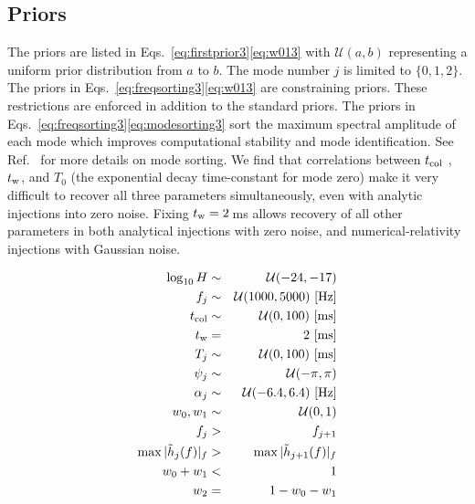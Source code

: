\documentclass[../Thesis.tex]{subfiles}
\begin{document}
\begin{subappendices}


\renewcommand\thefigure{\thesection.\arabic{figure}} 
\renewcommand\thetable{\thesection.\arabic{table}} 
\setcounter{figure}{0} 
\setcounter{table}{0} 


\section{Priors}
\label{appendix:a3}
    The priors are listed in Eqs.~\ref{eq:firstprior3}\Hyphdash*\ref{eq:w013} with $\mathcal{U}(a,b)$ representing a uniform prior distribution from $a$ to $b$. 
    The mode number $j$ is limited to $\lbrace 0,1,2 \rbrace$. 
    The priors in Eqs.~\ref{eq:freqsorting3}\Hyphdash*\ref{eq:w013} are constraining priors. 
    These restrictions are enforced in addition to the standard priors. 
    The priors in Eqs.~\ref{eq:freqsorting3}\Hyphdash*\ref{eq:modesorting3} sort the maximum spectral amplitude of each mode which improves computational stability and mode identification.
    See Ref.~\cite{Easter2020} for more details on mode sorting.
    We find that correlations between $t_{\mathrm{col}}$ , $t_{\mathrm{w}}$, and $T_0$ (the exponential decay time-constant for mode zero) make it very difficult to recover all three parameters simultaneously, even with analytic injections into zero noise.
    Fixing $t_{\mathrm{w}}=2$\,ms allows recovery of all other parameters in both analytical injections with zero noise, and numerical-relativity injections with Gaussian noise.
    
    
    \begin{eqnarray}
        \log_{10}{H} & \sim & \mathcal{U}(-24, -17)\label{eq:firstprior3}  \\
        f_j & \sim & \mathcal{U}(1000,5000)\  [\mathrm{Hz}]\\
        t_{\mathrm{col}} & \sim & \mathcal{U}(0,100)\  [\mathrm{ms}]\\
        t_{\mathrm{w}} & = & 2\  [\mathrm{ms}]\\
        T_j & \sim & \mathcal{U}(0,100)\ [\mathrm{ms}]\\
        \psi_j & \sim & \mathcal{U}(-\pi,\pi) \\
        \alpha_j & \sim & \mathcal{U}(-6.4,6.4)\   [\mathrm{Hz}] \\
        w_0, w_1 & \sim & \mathcal{U}(0,1)\label{eq:lastprior3}\\
        f_{j}  & > & f_{j+1}\label{eq:freqsorting3}\\
        \max|\tilde{h}_{j}(f)|_f & > & \max|\tilde{h}_{j+1}(f)|_f \label{eq:modesorting3}\\
        w_0+w_1 & < & 1  \label{eq:w013}\\
        w_2 & = & 1 - w_0 - w_1 \label{eq:w23}
    \end{eqnarray}
    \pagebreak
    

\end{subappendices}
\end{document}
